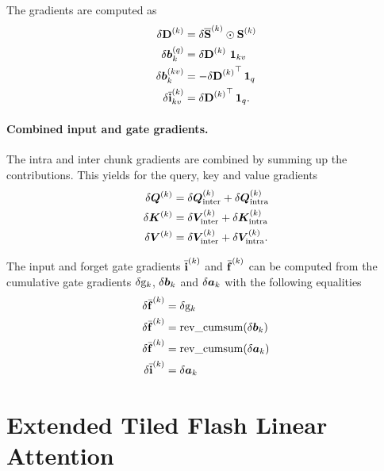 \documentclass{article}
\begin{document}
    The gradients are computed as
    \begin{align}
        \delta \bm{\mathrm{D}}^{(k)}                 & = \delta \overline{\bm{\mathrm{S}}}^{(k)} \odot \bm{\mathrm{S}}^{(k)} \\
        \delta \bm{b}_k^{(q)}                    & = \delta \bm{\mathrm{D}}^{(k)} \ \bm{1}_{kv}                   \\
        \delta \bm{b}_k^{(kv)}                   & = - {\delta \bm{\mathrm{D}}^{(k)}}^\top \, \bm{1}_q            \\
        \delta \overline{\bm{\mathrm{i}}}_{kv}^{(k)} & = {\delta \bm{\mathrm{D}}^{(k)}}^\top \, \bm{1}_q.
    \end{align}

    \paragraph{Combined input and gate gradients.}
    The intra and inter chunk gradients are combined by summing up the contributions.
    This yields for the query, key and value gradients
    \begin{align}
        \delta \bm{Q}^{(k)} & = \delta \bm{Q}^{(k)}_\text{inter} + \delta \bm{Q}^{(k)}_\text{intra}  \\
        \delta \bm{K}^{(k)} & = \delta \bm{V}^{(k)}_\text{inter} + \delta \bm{K}^{(k)}_\text{intra}  \\
        \delta \bm{V}^{(k)} & = \delta \bm{V}^{(k)}_\text{inter} + \delta \bm{V}^{(k)}_\text{intra}.
    \end{align}

    The input and forget gate gradients $\bar{\bm{\mathrm{i}}}^{(k)}$ and $\bar{\bm{\mathrm{f}}}^{(k)}$ can be computed from the cumulative gate gradients $\delta \mathrm{g}_k$, $\delta \bm{b}_k$ and $\delta \bm{a}_k$ with the following equalities
    \begin{align}
        \delta \bar{\bm{\mathrm{f}}}^{(k)} & = \delta \mathrm{g}_k                          \\
        \delta \bar{\bm{\mathrm{f}}}^{(k)} & = \mathrm{rev\_cumsum} ( \delta \bm{b}_k ) \\
        \delta \bar{\bm{\mathrm{f}}}^{(k)} & = \mathrm{rev\_cumsum} ( \delta \bm{a}_k ) \\
        \delta \bar{\bm{\mathrm{i}}}^{(k)} & = \delta \bm{a}_k
    \end{align}

    \newpage

    \section{Extended Tiled Flash Linear Attention}
    \label{app:extended_tiledflashlinearattention}
\end{document}
